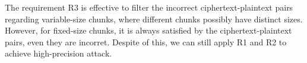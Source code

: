 The requirement R3 is effective to filter the incorrect ciphertext-plaintext pairs regarding variable-size chunks, where different chunks possibly have distinct sizes. However, for fixed-size chunks, it is always satisfied by the ciphertext-plaintext pairs, even they are incorret. Despite of this, we can still apply R1 and R2 to achieve high-precision attack.        









